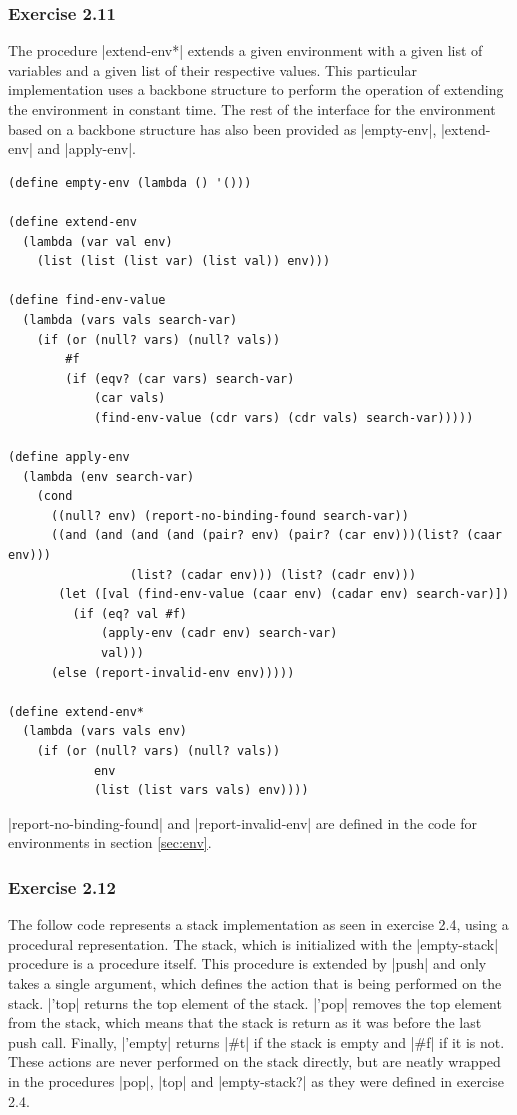 \documentclass[a4paper]{article}
\begin{document}
\subsubsection{Exercise 2.11}

The procedure |extend-env*| extends a given environment with a given list of variables and a given list of their respective values. This particular implementation uses a backbone structure to perform the operation of extending the environment in constant time. The rest of the interface for the environment based on a backbone structure has also been provided as |empty-env|, |extend-env| and |apply-env|.

\begin{lstlisting}
(define empty-env (lambda () '()))

(define extend-env
  (lambda (var val env)
    (list (list (list var) (list val)) env)))

(define find-env-value
  (lambda (vars vals search-var)
    (if (or (null? vars) (null? vals))
        #f
        (if (eqv? (car vars) search-var)
            (car vals)
            (find-env-value (cdr vars) (cdr vals) search-var)))))

(define apply-env
  (lambda (env search-var)
    (cond
      ((null? env) (report-no-binding-found search-var))
      ((and (and (and (and (pair? env) (pair? (car env)))(list? (caar env)))
                 (list? (cadar env))) (list? (cadr env)))
       (let ([val (find-env-value (caar env) (cadar env) search-var)])
         (if (eq? val #f)
             (apply-env (cadr env) search-var)
             val)))
      (else (report-invalid-env env)))))
      
(define extend-env*
  (lambda (vars vals env)
    (if (or (null? vars) (null? vals))
            env
            (list (list vars vals) env))))
\end{lstlisting}

|report-no-binding-found| and |report-invalid-env| are defined in the code for environments in section \ref{sec:env}.

\subsubsection{Exercise 2.12}

The follow code represents a stack implementation as seen in exercise 2.4, using a procedural representation. The stack, which is initialized with the |empty-stack| procedure is a procedure itself. This procedure is extended by |push| and only takes a single argument, which defines the action that is being performed on the stack. |'top| returns the top element of the stack. |'pop| removes the top element from the stack, which means that the stack is return as it was before the last push call. Finally, |'empty| returns |#t| if the stack is empty and |#f| if it is not. These actions are never performed on the stack directly, but are neatly wrapped in the procedures |pop|, |top| and |empty-stack?| as they were defined in exercise 2.4.
\end{document}
